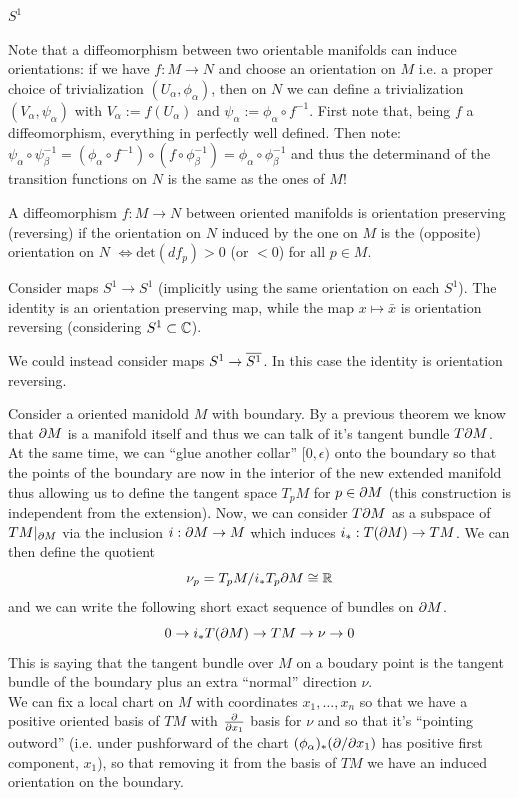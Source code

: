 \begin{ex}
    $S^1$ %
\end{ex}
Note that a diffeomorphism between two orientable manifolds can induce orientations: if we have $f:M\to N$ and choose an orientation on $M$ i.e. a proper choice of trivialization $(U_\alpha, \phi_\alpha)$, then on $N$ we can define a trivialization $(V_\alpha,\psi_\alpha)$ with $V_\alpha:=f(U_\alpha)$ and $\psi_\alpha:=\phi_\alpha\circ f^{-1}$. First note that, being $f$ a diffeomorphism, everything in perfectly well defined. Then note: $\psi_\alpha\circ\psi_\beta^{-1}=(\phi_\alpha\circ f^{-1})\circ (f\circ \phi_\beta^{-1})=\phi_\alpha\circ\phi_{\beta}^{-1}$ and thus the determinand of the transition functions on $N$ is the same as the ones of $M$!
\begin{defn}
    A diffeomorphism $f: M \to N$ between oriented manifolds is orientation preserving (reversing) if the orientation on $N$ induced by the one on $M$ is the (opposite) orientation on $N$ $\iff \text{det}(df_p)>0$ (or $<0$) for all $p\in M$.
\end{defn}
\begin{ex}
    Consider maps $S^1 \to S^1$ (implicitly using the same orientation on each $S^1$). The identity is an orientation preserving map, while the map $x \mapsto \bar x$ is orientation reversing (considering $S^1 \subset \mathbb{C}$).

    \noindent We could instead consider maps $S^1 \to \overline{S^1}$. In this case the identity is orientation reversing.
\end{ex}

Consider a oriented manidold $M$ with boundary. By a previous theorem we know that $\partial M$ is a manifold itself and thus we can talk of it's tangent bundle $T\partial M$. At the same time, we can ``glue another collar'' $[0,\epsilon)$ onto the boundary so that the points of the boundary are now in the interior of the new extended manifold thus allowing us to define the tangent space $T_p M$ for $p\in \partial M$ (this construction is independent from the extension). Now, we can consider $T\partial M$ as a subspace of $TM|_{\partial M}$ via the inclusion $i: \partial M \to M$ which induces $i_*: T(\partial M)\to TM$.
We can then define the quotient
$$
    \nu_p = T_p M /i_*T_p \partial M \cong \mathbb{R}
$$
and we can write the following short exact sequence of bundles on $\partial M$.
\begin{equation}
    0 \to i_*T(\partial M) \to TM \to \nu \to 0
\end{equation}
This is saying that the tangent bundle over $M$ on a boudary point is the tangent bundle of the boundary plus an extra ``normal'' direction $\nu$.\\
We can fix a local chart on $M$ with coordinates $x_1, \dots, x_n$ so that we have a positive oriented basis of $TM$ with $\frac{\partial}{\partial x_1}$ basis for $\nu$ and so that it's ``pointing outword'' (i.e. under pushforward of the chart $(\phi_{\alpha})_*(\partial/\partial x_1)$ has positive first component, $x_1$), so that removing it from the basis of $TM$ we have an induced orientation on the boundary.

